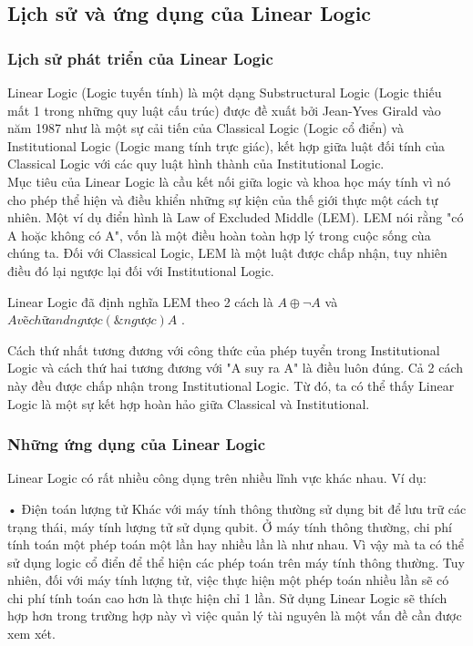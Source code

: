 \subsection{Lịch sử và ứng dụng của Linear Logic}
\subsubsection{Lịch sử phát triển của Linear Logic}
Linear Logic (Logic tuyến tính) là một dạng Substructural Logic (Logic thiếu mất 1 trong những quy luật cấu trúc) được đề xuất bởi Jean-Yves Girald vào năm 1987 như là một sự cải tiến của Classical Logic (Logic cổ điển) và Institutional Logic (Logic mang tính trực giác), kết hợp giữa luật đối tính của Classical Logic với các quy luật hình thành của Institutional Logic.\\

Mục tiêu của Linear Logic là cầu kết nối giữa logic và khoa học máy tính vì nó cho phép thể hiện và điều khiển những sự kiện của thế giới thực một cách tự nhiên. Một ví dụ điển hình là Law of Excluded Middle (LEM). LEM nói rằng "có A hoặc không có A", vốn là một điều hoàn toàn hợp lý trong cuộc sống cùa chúng ta. Đối với Classical Logic, LEM là một luật được chấp nhận, tuy nhiên điều đó lại ngược lại đối với Institutional Logic. 

Linear Logic đã định nghĩa LEM theo 2 cách là $ A \oplus \neg A $ và $ A vẽ chữ and ngược (\& ngược) A $ .

Cách thứ nhất tương đương với công thức của phép tuyển trong Institutional Logic và cách thứ hai tương đương với "A suy ra A" là điều luôn đúng. Cả 2 cách này đều được chấp nhận trong Institutional Logic. Từ đó, ta có thể thấy Linear Logic là một sự kết hợp hoàn hảo giữa Classical và Institutional.


\subsubsection{Những ứng dụng của Linear Logic}
Linear Logic có rất nhiều công dụng trên nhiều lĩnh vực khác nhau. Ví dụ:


•	Điện toán lượng tử
Khác với máy tính thông thường sử dụng bit để lưu trữ các trạng thái, máy tính lượng tử sử dụng qubit. Ở máy tính thông thường, chi phí tính toán một phép toán một lần hay nhiều lần là như nhau. Vì vậy mà ta có thể sử dụng logic cổ điển để thể hiện các phép toán trên máy tính thông thường. Tuy nhiên, đối với máy tính lượng tử, việc thực hiện một phép toán nhiều lần sẽ có chi phí tính toán cao hơn là thực hiện chỉ 1 lần. Sử dụng Linear Logic sẽ thích hợp hơn trong trường hợp này vì việc quản lý tài nguyên là một vấn đề cần được xem xét.


